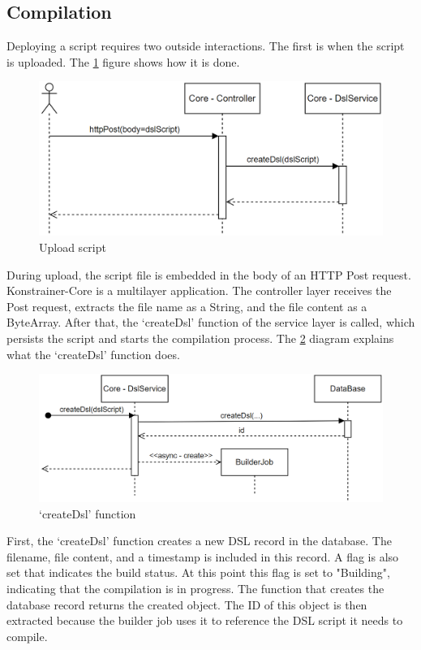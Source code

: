 \subsection{Compilation}
\label{sec:compile}

Deploying a script requires two outside interactions. The first is when the script is uploaded. The \ref{fig:seq0} figure shows how it is done.

\begin{figure}[h]
    \centering
    \includegraphics[width=130mm, keepaspectratio]{seq0.png}
    \caption{Upload script}
    \label{fig:seq0}
\end{figure}

During upload, the script file is embedded in the body of an HTTP Post request. Konstrainer-Core is a multilayer application. The controller layer receives the Post request, extracts the file name as a String, and the file content as a ByteArray. After that, the `createDsl' function of the service layer is called, which persists the script and starts the compilation process. The \ref{fig:seq1} diagram explains what the `createDsl' function does.

\begin{figure}[h]
    \centering
    \includegraphics[width=130mm, keepaspectratio]{seq1.png}
    \caption{`createDsl' function}
    \label{fig:seq1}
\end{figure}

First, the `createDsl' function creates a new DSL record in the database. The filename, file content, and a timestamp is included in this record. A flag is also set that indicates the build status. At this point this flag is set to "Building", indicating that the compilation is in progress. The function that creates the database record returns the created object. The ID of this object is then extracted because the builder job uses it to reference the DSL script it needs to compile.

